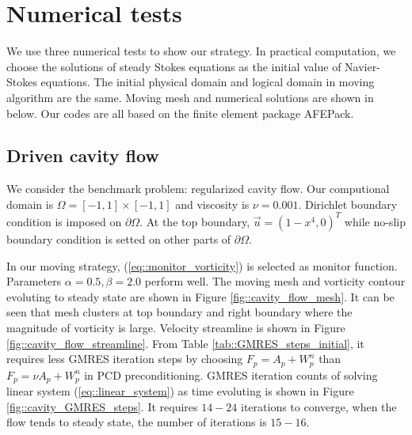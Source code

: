 \documentclass{eajam}
\begin{document}
\section{Numerical tests}
      \label{sec5} We use three numerical tests to show our strategy.
      In practical computation, we choose the solutions of steady
      Stokes equations as the initial value of Navier-Stokes
      equations. The initial physical domain
      and logical domain in moving algorithm are the same. Moving mesh
      and numerical solutions are shown in below. Our codes are all
      based on the finite element package AFEPack.

     \subsection{Driven cavity flow}
       We consider the benchmark problem: regularized cavity flow. Our
       computional domain is $\Omega = [-1, 1] \times [-1, 1]$ and
       viscosity is $\nu = 0.001$. Dirichlet boundary condition is
       imposed on $\partial \Omega$. At the top boundary, $\vec{u} =
       (1 - x^4, 0)^T$ while no-slip boundary condition is setted on
       other parts of $\partial \Omega$.
       
       In our moving strategy, (\ref{eq::monitor_vorticity}) is
       selected as monitor function. Parameters $\alpha = 0.5, \beta =
       2.0$ perform well. The moving mesh and vorticity contour
       evoluting to steady state are shown in Figure
       \ref{fig::cavity_flow_mesh}. It can be seen that mesh clusters
       at top boundary and right boundary where the magnitude of
       vorticity is large. Velocity streamline is shown in Figure
       \ref{fig::cavity_flow_streamline}.
       From Table \ref{tab::GMRES_steps_initial}, it requires less GMRES
       iteration steps by choosing $F_p = A_p + W_p^n$ than $F_p = \nu
       A_p + W_p^n$ in PCD preconditioning. GMRES iteration
       counts of solving linear system (\ref{eq::linear_system}) as
       time evoluting is shown in Figure \ref{fig::cavity_GMRES_steps}.
       It requires $14-24$ iterations to converge, when the flow tends
       to steady state, the number of iterations is $15 - 16$.
       
\end{document}
